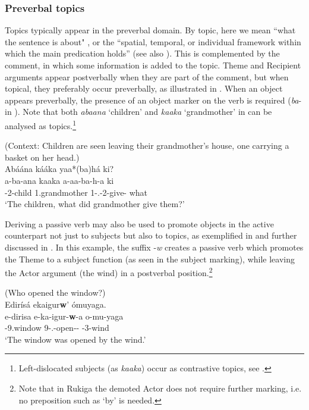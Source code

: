 \documentclass[output=paper]{langscibook}
\begin{document}
\z


\subsubsection{Preverbal topics}

Topics typically appear in the preverbal domain. By topic, here we mean ``what the sentence is about" \citep{Reinhart1981}, or the “spatial, temporal, or individual framework within which the main predication holds” \citep[50]{Chafe1976} (see also \cite{chapters/intro}). This is complemented by the comment, in which some information is added to the topic. Theme and Recipient arguments appear postverbally when they are part of the comment, but when  topical, they preferably occur preverbally, as illustrated in . When an object appears preverbally, the presence of an object marker on the verb is required (\textit{ba}- in ). Note that both \textit{abaana} ‘children’ and \textit{kaaka} ‘grandmother’ in  can be analysed as topics.\footnote{Left-dislocated subjects (as \textit{kaaka}) occur as contrastive topics, see .}

\ea
\label{bkm:Ref111449218}
(Context: Children are seen leaving their grandmother’s house, one carrying a basket on her head.)\\
  Abáána kááka yaa*(ba)há ki?\\
\gll
  a-ba-ana  kaaka  a-aa-ba-h-a  ki\\
  \AUG{}-2-child  1.grandmother  1\SM{}-\N{}.\PST{}-2\OM{}-give-\FV{}  what\\
\glt `The children, what did grandmother give them?'\\

\z

Deriving a passive verb may also be used to promote objects in the active counterpart not just to subjects but also to topics, as exemplified in  and further discussed in . In this example, the suffix \mbox{-\textit{w}} creates a passive verb which promotes the Theme to a subject function (as seen in the subject marking), while leaving the Actor argument (the wind) in a postverbal position.\footnote{Note that in Rukiga the demoted Actor does not require further marking, i.e. no preposition such as ‘by’ is needed.}

\ea
\label{bkm:Ref116291168}
(Who opened the window?)\\
Edirísá ekaigur\textbf{w}’ ómuyaga.\\
\gll
e-dirisa  e-ka-igur-\textbf{w}-a  o-mu-yaga\\
\AUG{}-9.window  9\SM{}-\F{}.\PST{}-open-\PASS{}-\FV{}  \AUG{}-3-wind\\
\glt
‘The window was opened by the wind.’\\
\end{document}
